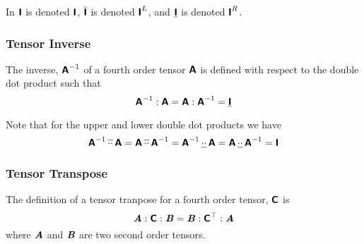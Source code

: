 In \cite{kintzel_fourth-order_2006,kintzel_fourth-order2_2006}
$  \boldsymbol{\mathsf{ I }}  $ is denoted $\boldsymbol{\mathsf{I}}$, $  \overline{\boldsymbol{\mathsf{ I }}}  $
is denoted $\boldsymbol{\mathsf{I}}^{L}$, and $  \underline{\boldsymbol{\mathsf{ I }}}  $ is denoted
$\boldsymbol{\mathsf{I}}^{R}$.

\subsubsection{Tensor Inverse}
\label{subsubsec:TensorInverseFourthOrder}

The inverse, ${\boldsymbol{\mathsf{A}}}^{-1}$ of a fourth order tensor
$\boldsymbol{\mathsf{A}}$ is defined with respect to the double dot product such that
\begin{equation}
   {\ensuremath{\boldsymbol{\mathsf{A}}}}^{-1} : \boldsymbol{\mathsf{A}} = \boldsymbol{\mathsf{A}} : {\boldsymbol{\mathsf{A}}}^{-1} =  \underline{\boldsymbol{\mathsf{ I }}}  
\end{equation}

Note that for the upper and lower double dot products we have
\begin{equation}
   {\ensuremath{\boldsymbol{\mathsf{A}}}}^{-1} \, \overline{\cdot\cdot} \, \boldsymbol{\mathsf{A}} = \boldsymbol{\mathsf{A}} \, \overline{\cdot\cdot} \, {\boldsymbol{\mathsf{A}}}^{-1} = {\boldsymbol{\mathsf{A}}}^{-1} \, \underline{\cdot\cdot} \, \boldsymbol{\mathsf{A}} = \boldsymbol{\mathsf{A}} \, \underline{\cdot\cdot} \, {\boldsymbol{\mathsf{A}}}^{-1} =  \boldsymbol{\mathsf{ I }}  
\end{equation}

\subsubsection{Tensor Transpose}
\label{subsubsec:TensorTransposeFourthOrder}

The definition of a tensor tranpose for a fourth order tensor, $\boldsymbol{\mathsf{C}}$ is
\begin{equation}
   \boldsymbol{\mathit{A}} : \boldsymbol{\mathsf{C}} : \boldsymbol{\mathit{B}} = \boldsymbol{\mathit{B}} :  {\boldsymbol{\mathsf{C}}}^{ \top }  : \boldsymbol{\mathit{A}} 
\end{equation}
where $\boldsymbol{\mathit{A}}$ and $\boldsymbol{\mathit{B}}$ are two second order tensors.


